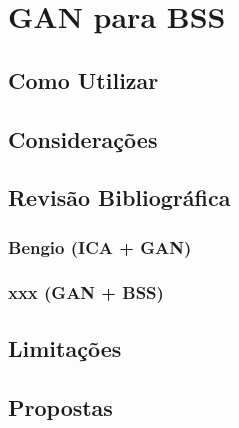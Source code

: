 \chapter{GAN para BSS}
\label{cha:gan_for_bss}

\section{Como Utilizar}
\label{sec:gan_for_bss_how_to_use}



\section{Considerações}
\label{sec:sec:gan_for_bss_considerations}



\section{Revisão Bibliográfica}
\label{sec:gan_for_bss_bib_review}




\subsection{Bengio (ICA + GAN)}
\label{subsec:gan_for_bss_ica_gan}



\subsection{xxx (GAN + BSS)}
\label{subsec:gan_for_bss_gan_bss}



\section{Limitações}
\label{sec:gan_for_bss_limitacoes}



\section{Propostas}
\label{sec:gan_for_bss_propositions}
